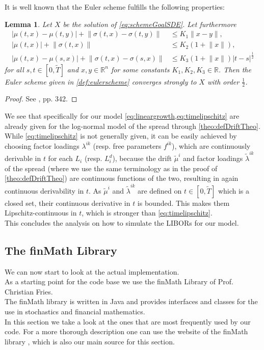 \documentclass[12pt]{article}
\newtheorem{lemma}[theorem]{Lemma}
\begin{document}
	It is well known that the Euler scheme fulfills the  following properties:
	\begin{lemma}
		Let $X$ be the solution of \cref{eq:schemeGoalSDE}. 
		Let furthermore 
		\begin{align}
			|\mu(t,x) - \mu(t,y)| + \lVert\sigma(t,x) - \sigma(t,y)\rVert &\le K_1 \lVert x - y\rVert, \label{eq:lipschitzcont}\\
			|\mu(t,x)| + \lVert\sigma(t,x)\rVert &\le K_2(1+\lVert x\rVert),\label{eq:lineargrowth}\\
			|\mu(t,x) - \mu(s,x)| + \lVert\sigma(t,x) - \sigma(s,x)\rVert &\le K_3 (1+\lVert x\rVert) |t - s|^{\frac{1}{2}}\label{eq:timelipschitz}
		\end{align}
		for all $s,t \in \left[0,\tilde{T}\right]$ and $x,y\in \mathbb{R}^n$ for some constants $K_1, K_2, K_3 \in \mathbb{R}$.
		Then the Euler scheme given in \cref{def:eulerscheme} converges strongly to $X$ with order $\frac{1}{2}$.
	\end{lemma}
	\begin{proof}
		See \cite{kloedenSchemes}, pp. 342.
	\end{proof}
	We see that specifically for our model \cref{eq:lineargrowth,eq:timelipschitz} are already given for the log-normal model of the spread through \cref{theo:defDriftTheo}.\\
	While \cref{eq:timelipschitz} is not generally given, it can be easily achieved by choosing factor loadings $\lambda^{i k}$ (resp. free parameters $f^{i k}$), which are continuously derivable in $t$ for each $L_i$ (resp. $L^d_i$), because the drift $\tilde{\mu}^i$ and factor loadings $\tilde{\lambda}^{i k}$ of the spread (where we use the same terminology as in the proof of \cref{theo:defDriftTheo}) are continuous functions of the two, resulting in again continuous derivability in $t$. As $\tilde{\mu}^i$ and $\tilde{\lambda}^{i k}$ are defined on $t\in\left[0,\tilde{T}\right]$  which is a closed set, their continuous derivative in $t$ is bounded. This makes them Lipschitz-continuous in $t$, which is stronger than \cref{eq:timelipschitz}.\\%
	This concludes the analysis on how to simulate the LIBORs for our model.
	
	
	\subsection{The finMath Library}
	We can now start to look at the actual implementation.\\
	As a starting point for the code base we use the finMath Library of Prof. Christian Fries.\\
	The finMath library is written in Java and provides interfaces and classes for the use in stochastics and financial mathematics.\\
	In this section we take a look at the ones that are most frequently used by our code. For a more thorough description one can use the website of the finMath library \cite{finmathWebsite}, which is also our main source for this section.
	
\end{document}
